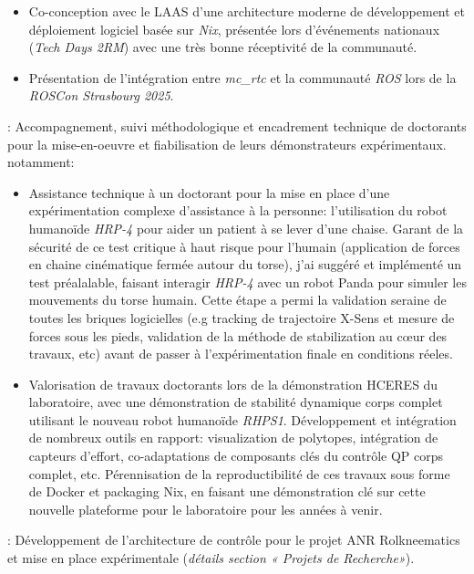 \begin{cventries}
{\begin{cvitems}
\begin{itemize}
          \item Co-conception avec le LAAS d'une architecture moderne de développement et déploiement logiciel basée sur \emph{Nix}, présentée lors d'événements nationaux (\emph{Tech Days 2RM}) avec une très bonne réceptivité de la communauté.
          \item Présentation de l'intégration entre \emph{mc\_rtc} et la communauté \emph{ROS} lors de la \emph{ROSCon Strasbourg 2025}.
          \end{itemize}
        \item {} : Accompagnement, suivi méthodologique et encadrement technique de doctorants pour la mise-en-oeuvre et fiabilisation de leurs démonstrateurs expérimentaux. notamment:
        \begin{itemize}
        \item Assistance technique à un doctorant pour la mise en place d'une expérimentation complexe d'assistance à la personne: l'utilisation du robot humanoïde \emph{HRP-4} pour aider un patient à se lever d'une chaise. Garant de la sécurité de ce test critique à haut risque pour l'humain (application de forces en chaine cinématique fermée autour du torse), j'ai suggéré et implémenté un test préalalable, faisant interagir \emph{HRP-4} avec un robot Panda pour simuler les mouvements du torse humain. Cette étape a permi la validation seraine de toutes les briques logicielles (e.g tracking de trajectoire X-Sens et mesure de forces sous les pieds, validation de la méthode de stabilization au cœur des travaux, etc) avant de passer à l'expérimentation finale en conditions réeles.
          \item Valorisation de travaux doctorants lors de la démonstration HCERES du laboratoire, avec une démonstration de stabilité dynamique corps complet utilisant le nouveau robot humanoïde \emph{RHPS1}. Développement et intégration de nombreux outils en rapport: visualization de polytopes, intégration de capteurs d'effort, co-adaptations de composants clés du contrôle QP corps complet, etc. Pérennisation de la reproductibilité de ces travaux sous forme de Docker et packaging Nix, en faisant une démonstration clé sur cette nouvelle plateforme pour le laboratoire pour les années à venir.
        \end{itemize}
        \item {}: Développement de l'architecture de contrôle pour le projet ANR Rolkneematics et mise en place expérimentale (\emph{détails section « Projets de Recherche»}).

\end{cvitems}}
\end{cventries}
